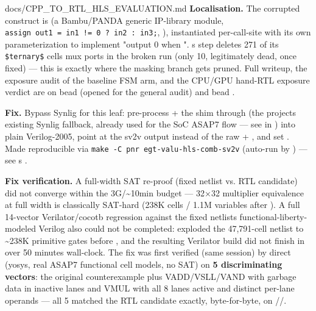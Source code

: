 \begin{relocated}{docs/CPP_TO_RTL_HLS_EVALUATION.md}
\textbf{Localisation.} The corrupted construct is 
(a Bambu/\allowbreak{}PANDA generic IP-library module,
\texttt{assign\ out1\ =\allowbreak{}\ in1\ !=\allowbreak{}\ 0\ ?\ in2\ :\allowbreak{}\ in3;},
), instantiated per-call-site with its
own parameterization to implement "output 0 when
".
\textquotesingle s  step
deletes 271 of its \texttt{\$ternary\$} cells\textquotesingle{} mux
ports in the broken run (only 10, legitimately dead, once fixed) ---
this is exactly where the masking branch gets pruned. Full writeup, the
exposure audit of the baseline FSM arm, and the CPU/GPU hand-RTL
exposure verdict are on bead  (opened for
the general  audit) and bead
.

\textbf{Fix.} Bypass Synlig for this leaf: pre-process 
+ the shim through  (the project\textquotesingle s existing
Synlig fallback, already used for the SoC ASAP7 flow --- see
 in ) into plain Verilog-2005,
point  at the sv2v output instead of the raw
 + , and set . Made
reproducible via
\texttt{make\ -\allowbreak{}C\ pnr\ egt-\allowbreak{}valu-\allowbreak{}hls-\allowbreak{}comb-\allowbreak{}sv2v}
(auto-run by ) --- see
\textquotesingle s
.

\textbf{Fix verification.} A full-width SAT re-proof (fixed netlist vs.
RTL candidate) did not converge within the 3G/\textasciitilde10min
budget --- 32×32 multiplier equivalence at full width is classically
SAT-hard (238K cells / 1.1M variables after ). A full
14-vector Verilator/\allowbreak{}cocotb regression against the fixed
netlist\textquotesingle s functional-liberty-modeled Verilog also could
not be completed:  exploded the 47,791-cell netlist to
\textasciitilde238K primitive gates before , and the
resulting Verilator build did not finish in over 50 minutes wall-clock.
The fix was first verified (same session) by direct  (yosys,
real ASAP7 functional cell models, no SAT) on \textbf{5 discriminating
vectors}: the original counterexample plus
VADD/\allowbreak{}VSLL/\allowbreak{}VAND with garbage data in inactive
lanes and VMUL with all 8 lanes active and distinct per-lane operands
--- all 5 matched the RTL candidate exactly, byte-for-byte, on
//.


\end{relocated}
